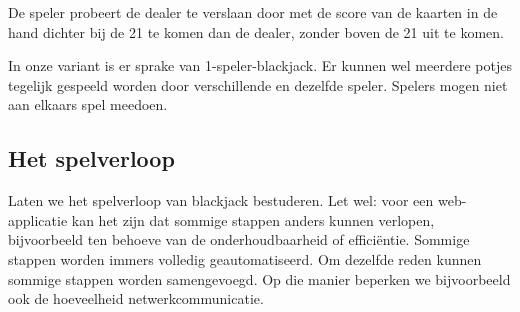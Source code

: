 De speler probeert de dealer te verslaan door met de score van de kaarten 
in de hand dichter bij de 21 te komen dan de dealer, 
zonder boven de 21 uit te komen.

In onze variant is er sprake van 1-speler-blackjack. Er kunnen wel 
meerdere potjes tegelijk gespeeld worden door verschillende en dezelfde 
speler. Spelers mogen niet aan elkaars spel meedoen.

\subsection{Het spelverloop}
Laten we het spelverloop van blackjack bestuderen.
Let wel: voor een web-applicatie kan het zijn dat sommige stappen
anders kunnen verlopen, bijvoorbeeld ten behoeve van de onderhoudbaarheid
of efficiëntie. Sommige stappen worden immers volledig geautomatiseerd. 
Om dezelfde reden kunnen sommige stappen worden samengevoegd. 
Op die manier beperken we bijvoorbeeld ook de hoeveelheid netwerkcommunicatie.

